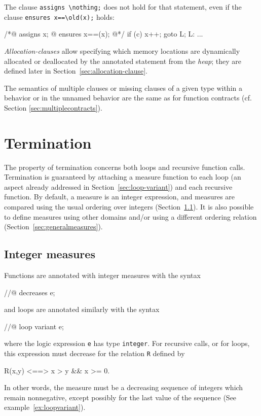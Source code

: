 \begin{example} The clause \lstinline|assigns \nothing;| does not hold for that statement,
even if the clause \lstinline|ensures x==\old(x);| holds: 
\begin{listing}{1}
/*@ assigns x;
  @ ensures x==\old(x);
  @*/
  if (c) {
    x++;
    goto L;
  }
L: ...
\end{listing}
\end{example}

\textsl{Allocation-clauses} allow specifying which memory locations 
are dynamically allocated or deallocated by the annotated statement from the \textsl{heap}; 
they are defined later in Section~\ref{sec:allocation-clause}.

The semantics of multiple clauses or missing clauses of a given type within a behavior or in the 
unnamed behavior are the same as for function contracts (cf. Section \ref{sec:multiplecontracts}).

\section{Termination}
\label{sec:termination}
The property of termination concerns both loops and recursive function
calls.
Termination is guaranteed by attaching a measure function to each loop
(an aspect already addressed in Section~\ref{sec:loop-variant}) 
and each recursive function.
By default, a measure is an
integer expression, and measures are compared using the usual ordering
over integers (Section~\ref{sec:integermeasures}). It is also possible
to define
measures using other domains and/or using a different ordering relation
(Section~\ref{sec:generalmeasures}).

\subsection{Integer measures}
\label{sec:integermeasures}
Functions are annotated with integer measures with the syntax
\begin{listing-nonumber}
//@ decreases e;
\end{listing-nonumber}
and loops are annotated similarly with the syntax
\begin{listing-nonumber}
//@ loop variant e;
\end{listing-nonumber}
where the logic expression \lstinline|e| has type
\lstinline|integer|.
For recursive calls, or for loops, this expression must decrease for
the
relation \lstinline|R| defined by
\begin{listing-nonumber}
R(x,y) <==> x > y && x >= 0.
\end{listing-nonumber}
In other words, the measure must be a decreasing sequence of integers
which remain nonnegative, except possibly for the last value of the
sequence (See example~\ref{ex:loopvariant}).

